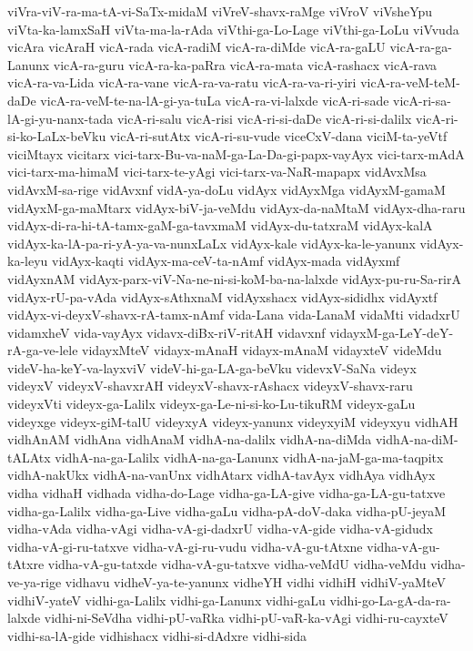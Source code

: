 {viVra-viV-ra-ma-tA-vi-SaTx-midaM
viVreV-shavx-raMge
viVroV
viVsheYpu
viVta-ka-lamxSaH
viVta-ma-la-rAda
viVthi-ga-Lo-Lage
viVthi-ga-LoLu
viVvuda
vicAra
vicAraH
vicA-rada
vicA-radiM
vicA-ra-diMde
vicA-ra-gaLU
vicA-ra-ga-Lanunx
vicA-ra-guru
vicA-ra-ka-paRra
vicA-ra-mata
vicA-rashacx
vicA-rava
vicA-ra-va-Lida
vicA-ra-vane
vicA-ra-va-ratu
vicA-ra-va-ri-yiri
vicA-ra-veM-teM-daDe
vicA-ra-veM-te-na-lA-gi-ya-tuLa
vicA-ra-vi-lalxde
vicA-ri-sade
vicA-ri-sa-lA-gi-yu-nanx-tada
vicA-ri-salu
vicA-risi
vicA-ri-si-daDe
vicA-ri-si-dalilx
vicA-ri-si-ko-LaLx-beVku
vicA-ri-sutAtx
vicA-ri-su-vude
viceCxV-dana
viciM-ta-yeVtf
viciMtayx
vicitarx
vici-tarx-Bu-va-naM-ga-La-Da-gi-papx-vayAyx
vici-tarx-mAdA
vici-tarx-ma-himaM
vici-tarx-te-yAgi
vici-tarx-va-NaR-mapapx
vidAvxMsa
vidAvxM-sa-rige
vidAvxnf
vidA-ya-doLu
vidAyx
vidAyxMga
vidAyxM-gamaM
vidAyxM-ga-maMtarx
vidAyx-biV-ja-veMdu
vidAyx-da-naMtaM
vidAyx-dha-raru
vidAyx-di-ra-hi-tA-tamx-gaM-ga-tavxmaM
vidAyx-du-tatxraM
vidAyx-kalA
vidAyx-ka-lA-pa-ri-yA-ya-va-nunxLaLx
vidAyx-kale
vidAyx-ka-le-yanunx
vidAyx-ka-leyu
vidAyx-kaqti
vidAyx-ma-ceV-ta-nAmf
vidAyx-mada
vidAyxmf
vidAyxnAM
vidAyx-parx-viV-Na-ne-ni-si-koM-ba-na-lalxde
vidAyx-pu-ru-Sa-rirA
vidAyx-rU-pa-vAda
vidAyx-sAthxnaM
vidAyxshacx
vidAyx-sididhx
vidAyxtf
vidAyx-vi-deyxV-shavx-rA-tamx-nAmf
vida-Lana
vida-LanaM
vidaMti
vidadxrU
vidamxheV
vida-vayAyx
vidavx-diBx-riV-ritAH
vidavxnf
vidayxM-ga-LeY-deY-rA-ga-ve-lele
vidayxMteV
vidayx-mAnaH
vidayx-mAnaM
vidayxteV
videMdu
videV-ha-keY-va-layxviV
videV-hi-ga-LA-ga-beVku
videvxV-SaNa
videyx
videyxV
videyxV-shavxrAH
videyxV-shavx-rAshacx
videyxV-shavx-raru
videyxVti
videyx-ga-Lalilx
videyx-ga-Le-ni-si-ko-Lu-tikuRM
videyx-gaLu
videyxge
videyx-giM-talU
videyxyA
videyx-yanunx
videyxyiM
videyxyu
vidhAH
vidhAnAM
vidhAna
vidhAnaM
vidhA-na-dalilx
vidhA-na-diMda
vidhA-na-diM-tALAtx
vidhA-na-ga-Lalilx
vidhA-na-ga-Lanunx
vidhA-na-jaM-ga-ma-taqpitx
vidhA-nakUkx
vidhA-na-vanUnx
vidhAtarx
vidhA-tavAyx
vidhAya
vidhAyx
vidha
vidhaH
vidhada
vidha-do-Lage
vidha-ga-LA-give
vidha-ga-LA-gu-tatxve
vidha-ga-Lalilx
vidha-ga-Live
vidha-gaLu
vidha-pA-doV-daka
vidha-pU-jeyaM
vidha-vAda
vidha-vAgi
vidha-vA-gi-dadxrU
vidha-vA-gide
vidha-vA-gidudx
vidha-vA-gi-ru-tatxve
vidha-vA-gi-ru-vudu
vidha-vA-gu-tAtxne
vidha-vA-gu-tAtxre
vidha-vA-gu-tatxde
vidha-vA-gu-tatxve
vidha-veMdU
vidha-veMdu
vidha-ve-ya-rige
vidhavu
vidheV-ya-te-yanunx
vidheYH
vidhi
vidhiH
vidhiV-yaMteV
vidhiV-yateV
vidhi-ga-Lalilx
vidhi-ga-Lanunx
vidhi-gaLu
vidhi-go-La-gA-da-ra-lalxde
vidhi-ni-SeVdha
vidhi-pU-vaRka
vidhi-pU-vaR-ka-vAgi
vidhi-ru-cayxteV
vidhi-sa-lA-gide
vidhishacx
vidhi-si-dAdxre
vidhi-sida
}

